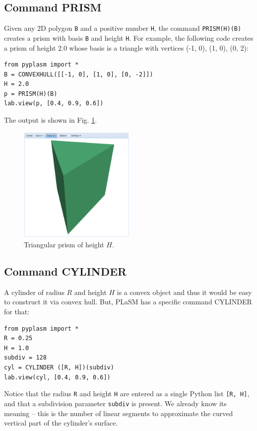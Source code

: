 \documentclass{article}
\begin{document}
\subsection{Command PRISM}

Given any 2D polygon {\tt B} and a positive number {\tt H}, the command {\tt PRISM(H)(B)} 
creates a prism with basis {\tt B} and height {\tt H}. For example, the 
following code creates a prism of height $2.0$ whose basis is a triangle 
with vertices (-1, 0), (1, 0), (0, 2):

\begin{verbatim}
from pyplasm import *
B = CONVEXHULL([[-1, 0], [1, 0], [0, -2]])
H = 2.0
p = PRISM(H)(B)
lab.view(p, [0.4, 0.9, 0.6])
\end{verbatim}
The output is shown in Fig. \ref{fig:prism}.

\begin{figure}[!ht]
\begin{center}
\includegraphics[width=0.5\textwidth]{img/prism-0.png}
\end{center}
\vspace{-2mm}
\caption{Triangular prism of height $H$.}
\label{fig:prism}
\end{figure}

\subsection{Command CYLINDER}

A cylinder of radius $R$ and height $H$ is a convex object 
and thus it would be easy to construct it via convex hull. 
But, PLaSM has a specific command CYLINDER for that:

\begin{verbatim}
from pyplasm import *
R = 0.25
H = 1.0
subdiv = 128
cyl = CYLINDER ([R, H])(subdiv)
lab.view(cyl, [0.4, 0.9, 0.6])
\end{verbatim}
Notice that the radius {\tt R} and height {\tt H} are entered  
as a single Python list {\tt [R, H]}, and that a subdivision parameter 
{\tt subdiv} is present. We already know its meaning -- this is the 
number of linear segments to approximate the curved vertical part
of the cylinder's surface. 
\end{document}
